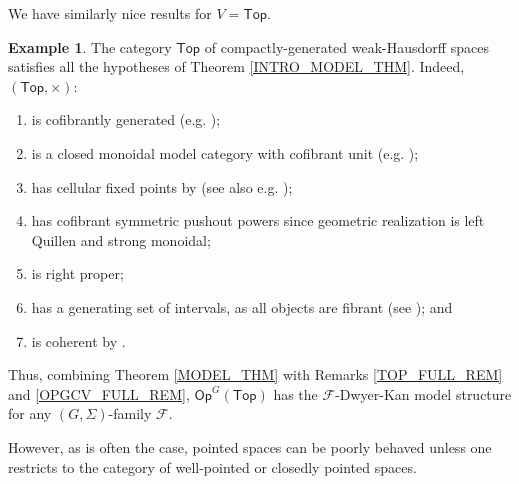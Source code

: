 \documentclass[a4paper,10pt
,draft
]{article}%
\numberwithin{equation}{section}
\numberwithin{figure}{section}
\theoremstyle{definition} %
\newtheorem{example}[equation]{Example}%
\newcommand{\Top}{\ensuremath{\mathsf{Top}}}
\newcommand{\Op}{\mathsf{Op}}%
\newcommand{\F}{\ensuremath{\mathcal F}}
\newcommand{\1}{\ensuremath{\mathbbm 1}}%
\begin{document}
We have similarly nice results for $V = \Top$.
\begin{example}
      The category $\Top$ of compactly-generated weak-Hausdorff spaces satisfies all the hypotheses of Theorem \ref{INTRO_MODEL_THM}.
      Indeed, $(\Top, \times)$:
      \begin{enumerate}[label = (\roman*)]\itemsep-4pt
      \item is cofibrantly generated (e.g. \cite{Pia91});
      \item is a closed monoidal model category with cofibrant unit (e.g. \cite[Prop. 4.2.11]{Hov99});
      \item has cellular fixed points by \cite{Pia91} (see also e.g. \cite[Lemma 3.18]{Ste16});
      \item has cofibrant symmetric pushout powers since geometric realization is left Quillen and strong monoidal;
      \item is right proper;
      \item has a generating set of intervals, as all objects are fibrant (see \cite[Lemma 2.1]{BM13}); and
      \item is coherent by \cite[Lem. 4.16]{BV73}.
      \end{enumerate}
      Thus, combining Theorem \ref{MODEL_THM} with Remarks \ref{TOP_FULL_REM} and \ref{OPGCV_FULL_REM},
      $\Op^G(\Top)$ has the $\F$-Dwyer-Kan model structure for any $(G, \Sigma)$-family $\F$. %

      However, as is often the case, pointed spaces can be poorly behaved unless one restricts to the category of well-pointed or closedly pointed spaces. %
\end{example}


\end{document}
